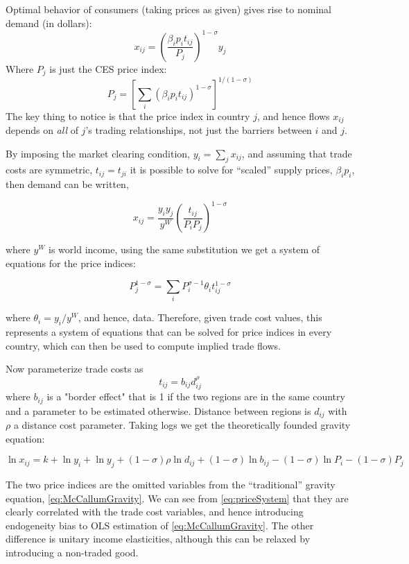 \documentclass[twoside]{article}
\begin{document}
Optimal behavior of consumers (taking prices as given) gives rise to nominal demand (in dollars): 
$$ x_{ij} = \left( \frac{ \beta_i p_i t_{ij} }{ P_j } \right)^{1 - \sigma} y_j $$
Where $P_j$ is just the CES price index:
$$ P_j = \left[ \sum_i (\beta_i p_i t_{ij} )^{1-\sigma} \right]^{1/(1-\sigma)} $$
The key thing to notice is that the price index in country $j$, and hence flows $x_{ij}$ depends on \emph{all} of $j$'s trading relationships, not just the barriers between $i$ and $j$. 

By imposing the market clearing condition, $y_i = \sum_j x_{ij}$, and assuming that trade costs are symmetric, 
$t_{ij} = t_{ji}$ it is possible to solve for ``scaled'' supply prices, $\beta_i p_i$, then demand can be written,

$$ x_{ij} = \frac{y_i y_j}{y^W} \left( \frac{t_{ij}}{P_i P_j} \right)^{1-\sigma} $$  

where $y^W$ is world income, using the same substitution we get a system of equations for the price indices: 

\begin{equation} \label{eq:priceSystem}
 P_j^{1-\sigma} = \sum_i P_i^{\sigma - 1} \theta_i t_{ij}^{1-\sigma}
\end{equation} 

where $\theta_i = y_i / y^W$, and hence, data. Therefore, given trade cost values, this represents a system of equations that can be solved for price indices in every country, which can then be used to compute implied trade flows. 

Now parameterize trade costs as
$$ t_{ij} = b_{ij}d_{ij}^\rho $$
where $b_{ij}$ is a "border effect" that is 1 if the two regions are in the same country and a parameter to be estimated otherwise. Distance between regions is $d_{ij}$ with $\rho$ a distance cost parameter. Taking logs we get the theoretically founded gravity equation: 

$$ \ln x_{ij} = k + \ln y_i +  \ln y_j + (1 - \sigma) \rho \ln d_{ij} + (1 - \sigma) \ln b_{ij} - (1 - \sigma) \ln P_i - (1-\sigma) P_j $$

The two price indices are the omitted variables from the ``traditional'' gravity equation, \eqref{eq:McCallumGravity}. We can see from \eqref{eq:priceSystem} that they are clearly correlated with the trade cost variables, and hence introducing endogeneity bias to OLS estimation of \eqref{eq:McCallumGravity}.  The other difference is unitary income elasticities, although this can be relaxed by introducing a non-traded good. 
\end{document}
